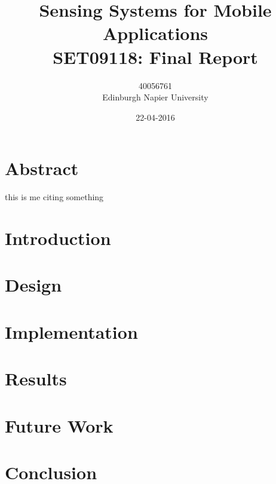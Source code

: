 \documentclass{article}
\title{Sensing Systems for Mobile Applications\\SET09118: Final Report}
\author{40056761\\Edinburgh Napier University}
\date{22-04-2016}
\begin{document}
		
	\maketitle
	
	\section{Abstract}
		\lipsum[1]
		
		this is me citing something \cite{Leonardo:online}
				
	\newpage
		
		
	\tableofcontents
	
	\newpage
		
	\section{Introduction}
		\lipsum[2-4]
	
	\section{Design}
		\lipsum[3-6]

	\section{Implementation}
		\lipsum[4-7]
	
	\section{Results}
		\lipsum[6-8]
	
	\section{Future Work}
		\lipsum[8-9]
	
	\section{Conclusion}
		\lipsum[9-13]
		
		
		
		
\end{document}
